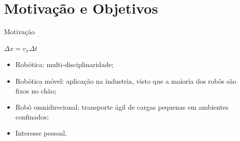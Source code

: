 \documentclass{beamer}
\begin{document}
\section{Motivação e Objetivos}
\begin{frame}{Motivação}

 $\Delta x = v_x \Delta t $
  \begin{itemize}
    \item{Robótica: multi-disciplinaridade;}
    \item{Robótica móvel: aplicação na industria, visto que a maioria dos robôs são fixos no chão;}
    \item{Robô omnidirecional: transporte ágil de cargas pequenas em ambientes confinados;}
    \item{Interesse pessoal.}
  \end{itemize}
\end{frame}

\end{document}

